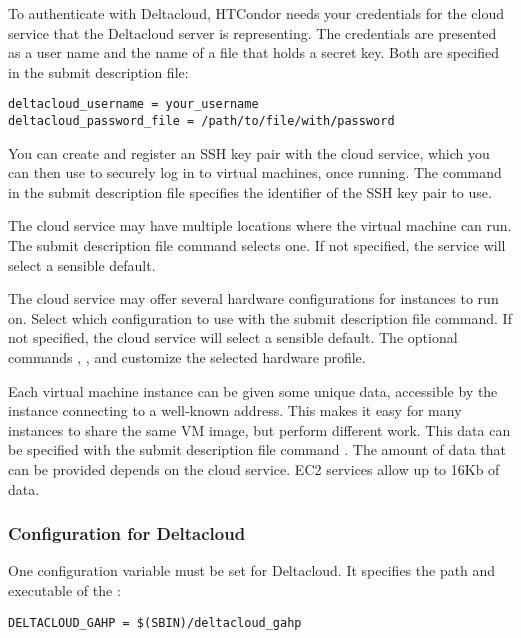 To authenticate with Deltacloud, HTCondor needs your credentials for
the cloud service that the Deltacloud server is representing. 
The credentials are
presented as a user name and the name of a file that holds a secret key.
Both are specified in the submit description file:

\begin{verbatim}
deltacloud_username = your_username
deltacloud_password_file = /path/to/file/with/password
\end{verbatim}

You can create and register an SSH key pair with the cloud service,
which you can then use to securely log in to virtual machines,
once running.
The command  in the
submit description file specifies the identifier of the SSH key pair
to use.

The cloud service may have multiple locations where the virtual
machine can run. 
The submit description file command 
selects one.
If not specified, the service will select a sensible default.

The cloud service may offer several hardware configurations for
instances to run on.
Select which configuration to use with the
 submit description file command. 
If not specified, the cloud service will select a sensible default.
The optional commands ,
, and
customize the selected hardware profile.

Each virtual machine instance can be given some unique data, 
accessible by the instance connecting to a well-known address.
This makes it easy for many instances to share the same VM image,
but perform different work.
This data can be specified with the submit description file command
.
The amount of data that can be provided depends on the cloud service.
EC2 services allow up to 16Kb of data.

\subsubsection{\label{sec:Deltacloud-config}Configuration for Deltacloud}

One configuration variable 
must be set for Deltacloud.
It specifies the path and executable of the :

\footnotesize
\begin{verbatim}
DELTACLOUD_GAHP = $(SBIN)/deltacloud_gahp
\end{verbatim}
\normalsize
